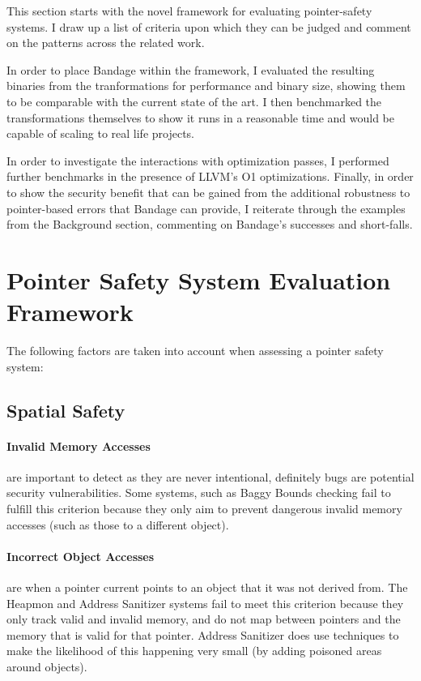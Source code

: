 \newcommand*\rot{\rotatebox{90}}
\newcommand{\xmark}{\ding{55}}

This section starts with the novel framework for evaluating pointer-safety systems.
I draw up a list of criteria upon which they can be judged and comment on the patterns across the related work.

In order to place Bandage within the framework, I evaluated the resulting binaries from the tranformations for performance and binary size, showing them to be comparable with the current state of the art.
I then benchmarked the transformations themselves to show it runs in a reasonable time and would be capable of scaling to real life projects.

In order to investigate the interactions with optimization passes, I performed further benchmarks in the presence of LLVM's O1 optimizations.
Finally, in order to show the security benefit that can be gained from the additional robustness to pointer-based errors that Bandage can provide, I reiterate through the examples from the Background section, commenting on Bandage's successes and short-falls.

\section{Pointer Safety System Evaluation Framework}

The following factors are taken into account when assessing a pointer safety system:

\subsection{Spatial Safety}

\paragraph{Invalid Memory Accesses} are important to detect as they are never intentional, definitely bugs are potential security vulnerabilities.
Some systems, such as Baggy Bounds checking fail to fulfill this criterion because they only aim to prevent dangerous invalid memory accesses (such as those to a different object).

\paragraph{Incorrect Object Accesses} are when a pointer current points to an object that it was not derived from.
The Heapmon and Address Sanitizer systems fail to meet this criterion because they only track valid and invalid memory, and do not map between pointers and the memory that is valid for that pointer.
Address Sanitizer does use techniques to make the likelihood of this happening very small (by adding poisoned areas around objects).

